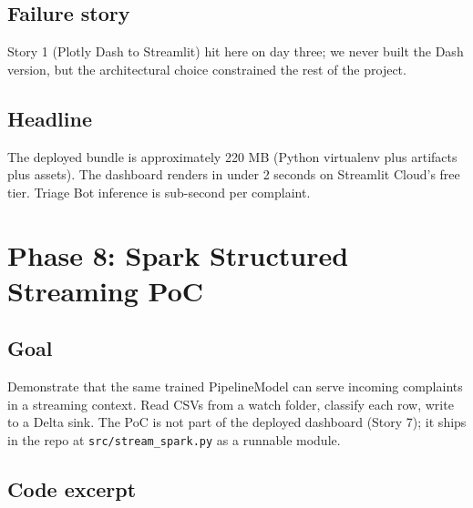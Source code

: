 \documentclass[11pt,letterpaper]{book}
\begin{document}
\subsection*{Failure story}

Story 1 (Plotly Dash to Streamlit) hit here on day three; we never built the Dash version, but the architectural choice constrained the rest of the project.

\subsection*{Headline}

The deployed bundle is approximately 220 MB (Python virtualenv plus artifacts plus assets). The dashboard renders in under 2 seconds on Streamlit Cloud's free tier. Triage Bot inference is sub-second per complaint.

\section{Phase 8: Spark Structured Streaming PoC}
\label{sec:phase8}

\subsection*{Goal}

Demonstrate that the same trained PipelineModel can serve incoming complaints in a streaming context. Read CSVs from a watch folder, classify each row, write to a Delta sink. The PoC is not part of the deployed dashboard (Story 7); it ships in the repo at \texttt{src/stream\_spark.py} as a runnable module.

\subsection*{Code excerpt}
\end{document}
